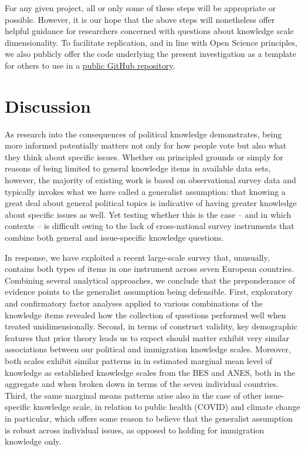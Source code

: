 \documentclass[11pt,halfline,a4paper,]{ouparticle}
\begin{document}
For any given project, all or only some of these steps will be
appropriate or possible. However, it is our hope that the above steps
will nonetheless offer helpful guidance for researchers concerned with
questions about knowledge scale dimensionality. To facilitate
replication, and in line with Open Science principles, we also publicly
offer the code underlying the present investigation as a template for
others to use in a
\href{https://github.com/ahlstromvij/REMINDER_project}{public GitHub
repository}.

\hypertarget{discussion}{%
\section{Discussion}\label{discussion}}

As research into the consequences of political knowledge demonstrates,
being more informed potentially matters not only for how people vote but
also what they think about specific issues. Whether on principled
grounds or simply for reasons of being limited to general knowledge
items in available data sets, however, the majority of existing work is
based on observational survey data and typically invokes what we have
called a generalist assumption: that knowing a great deal about general
political topics is indicative of having greater knowledge about
specific issues as well. Yet testing whether this is the case -- and in
which contexts -- is difficult owing to the lack of cross-national
survey instruments that combine both general and issue-specific
knowledge questions.

In response, we have exploited a recent large-scale survey that,
unusually, contains both types of items in one instrument across seven
European countries. Combining several analytical approaches, we conclude
that the preponderance of evidence points to the generalist assumption
being defensible. First, exploratory and confirmatory factor analyses
applied to various combinations of the knowledge items revealed how the
collection of questions performed well when treated unidimensionally.
Second, in terms of construct validity, key demographic features that
prior theory leads us to expect should matter exhibit very similar
associations between our political and immigration knowledge scales.
Moreover, both scales exhibit similar patterns in in estimated marginal
mean level of knowledge as established knowledge scales from the BES and
ANES, both in the aggregate and when broken down in terms of the seven
individual countries. Third, the same marginal means patterns arise also
in the case of other issue-specific knowledge scale, in relation to
public health (COVID) and climate change in particular, which offers
some reason to believe that the generalist assumption is robust across
individual issues, as opposed to holding for immigration knowledge only.
\end{document}
